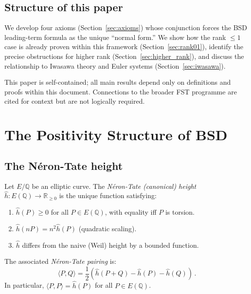 \documentclass[aps,prd,twocolumn,superscriptaddress,nofootinbib]{revtex4-2}
\theoremstyle{definition}
\theoremstyle{remark}
\begin{document}
\subsection{Structure of this paper}

We develop four axioms (Section~\ref{sec:axioms}) whose conjunction forces the BSD leading-term formula as the unique ``normal form.'' We show how the rank $\leq 1$ case is already proven within this framework (Section~\ref{sec:rank01}), identify the precise obstructions for higher rank (Section~\ref{sec:higher_rank}), and discuss the relationship to Iwasawa theory and Euler systems (Section~\ref{sec:iwasawa}).

This paper is self-contained; all main results depend only on definitions and proofs within this document. Connections to the broader FST programme are cited for context but are not logically required.


\section{The Positivity Structure of BSD}
\label{sec:positivity}

\subsection{The N\'eron-Tate height}

Let $E/\mathbb{Q}$ be an elliptic curve. The \textit{N\'eron-Tate (canonical) height} $\hat{h}: E(\mathbb{Q}) \to \mathbb{R}_{\geq 0}$ is the unique function satisfying:
\begin{enumerate}
\item $\hat{h}(P) \geq 0$ for all $P \in E(\mathbb{Q})$, with equality iff $P$ is torsion.
\item $\hat{h}(nP) = n^2 \hat{h}(P)$ (quadratic scaling).
\item $\hat{h}$ differs from the naive (Weil) height by a bounded function.
\end{enumerate}

The associated \textit{N\'eron-Tate pairing} is:
\begin{equation}
\langle P, Q \rangle = \frac{1}{2}\left(\hat{h}(P+Q) - \hat{h}(P) - \hat{h}(Q)\right)\,.
\label{eq:NT_pairing}
\end{equation}
In particular, $\langle P, P \rangle = \hat{h}(P)$ for all $P \in E(\mathbb{Q})$.
\end{document}
